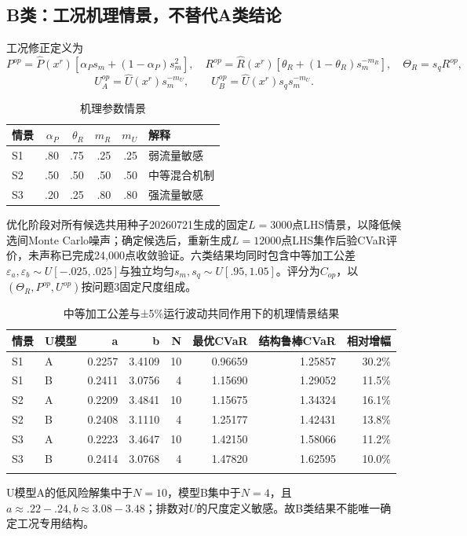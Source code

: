 \documentclass[UTF8,a4paper,10pt]{ctexart}
\begin{document}
\subsection*{B类：工况机理情景，不替代A类结论}
工况修正定义为
\[P^{op}=\widehat P(x^r)[\alpha_Ps_m+(1-\alpha_P)s_m^2],\quad
R^{op}=\widehat R(x^r)[\theta_R+(1-\theta_R)s_m^{-m_R}],\quad \Theta_R=s_qR^{op},\]
\[U_A^{op}=\widehat U(x^r)s_m^{-m_U},\qquad U_B^{op}=\widehat U(x^r)s_qs_m^{-m_U}.\]
\begin{table}[H]\centering\scriptsize\caption{机理参数情景}\begin{tabular}{lrrrrl}\toprule 情景&$\alpha_P$&$\theta_R$&$m_R$&$m_U$&解释\\\midrule
S1&.80&.75&.25&.25&弱流量敏感\\S2&.50&.50&.50&.50&中等混合机制\\S3&.20&.25&.80&.80&强流量敏感\\\bottomrule\end{tabular}\end{table}
优化阶段对所有候选共用种子20260721生成的固定$L=3000$点LHS情景，以降低候选间Monte Carlo噪声；确定候选后，重新生成$L=12000$点LHS集作后验CVaR评价，未声称已完成24,000点收敛验证。六类结果均同时包含中等加工公差$\varepsilon_a,\varepsilon_b\sim U[-.025,.025]$与独立均匀$s_m,s_q\sim U[.95,1.05]$。评分为$C_{op}$，以$(\Theta_R,P^{op},U^{op})$按问题3固定尺度组成。
\begin{table}[H]\centering\scriptsize\caption{中等加工公差与±5\%运行波动共同作用下的机理情景结果}\begin{tabular}{llrrrrrr}\toprule 情景&U模型&a&b&N&最优CVaR&结构鲁棒CVaR&相对增幅\\\midrule
S1 & A & 0.2257 & 3.4109 & 10 & 0.96659 & 1.25857 & 30.2\% \\
S1 & B & 0.2411 & 3.0756 & 4 & 1.15690 & 1.29052 & 11.5\% \\
S2 & A & 0.2209 & 3.4841 & 10 & 1.15675 & 1.34324 & 16.1\% \\
S2 & B & 0.2408 & 3.1110 & 4 & 1.25177 & 1.42431 & 13.8\% \\
S3 & A & 0.2223 & 3.4647 & 10 & 1.42150 & 1.58066 & 11.2\% \\
S3 & B & 0.2414 & 3.0768 & 4 & 1.47820 & 1.62595 & 10.0\% \\\\\bottomrule\end{tabular}\end{table}
U模型A的低风险解集中于$N=10$，模型B集中于$N=4$，且$a\approx.22-.24,b\approx3.08-3.48$；排数对$U$的尺度定义敏感。故B类结果不能唯一确定工况专用结构。
\end{document}
